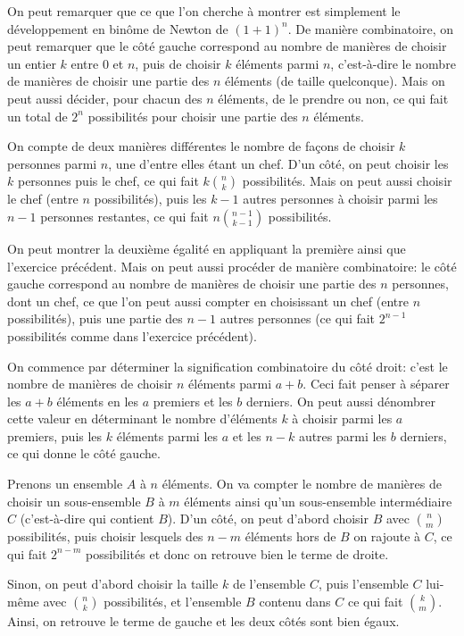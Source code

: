 \begin{sol}
On peut remarquer que ce que l'on cherche à montrer est simplement le développement en binôme de Newton de $(1+1)^n$. De manière combinatoire, on peut remarquer que le côté gauche correspond au nombre de manières de choisir un entier $k$ entre $0$ et $n$, puis de choisir $k$ éléments parmi $n$, c'est-à-dire le nombre de manières de choisir une partie des $n$ éléments (de taille quelconque). Mais on peut aussi décider, pour chacun des $n$ éléments, de le prendre ou non, ce qui fait un total de $2^n$ possibilités pour choisir une partie des $n$ éléments.
\end{sol}

\begin{sol}
On compte de deux manières différentes le nombre de façons de choisir $k$ personnes parmi $n$, une d'entre elles étant un chef. D'un côté, on peut choisir les $k$ personnes puis le chef, ce qui fait $k\binom nk$ possibilités. Mais on peut aussi choisir le chef (entre $n$ possibilités), puis les $k-1$ autres personnes à choisir parmi les $n-1$ personnes restantes, ce qui fait $n\binom{n-1}{k-1}$ possibilités.

On peut montrer la deuxième égalité en appliquant la première ainsi que l'exercice précédent. Mais on peut aussi procéder de manière combinatoire: le côté gauche correspond au nombre de manières de choisir une partie des $n$ personnes, dont un chef, ce que l'on peut aussi compter en choisissant un chef (entre $n$ possibilités), puis une partie des $n-1$ autres personnes (ce qui fait $2^{n-1}$ possibilités comme dans l'exercice précédent).
\end{sol}

\begin{sol}
On commence par déterminer la signification combinatoire du côté droit: c'est le nombre de manières de choisir $n$ éléments parmi $a+b$. Ceci fait penser à séparer les $a+b$ éléments en les $a$ premiers et les $b$ derniers. On peut aussi dénombrer cette valeur en déterminant le nombre d'éléments $k$ à choisir parmi les $a$ premiers, puis les $k$ éléments parmi les $a$ et les $n-k$ autres parmi les $b$ derniers, ce qui donne le côté gauche.
\end{sol}

\begin{sol}
Prenons un ensemble $A$ à $n$ éléments. On va compter le nombre de manières de choisir un sous-ensemble $B$ à $m$ éléments ainsi qu'un sous-ensemble intermédiaire $C$ (c'est-à-dire qui contient $B$). D'un côté, on peut d'abord choisir $B$ avec $\binom nm$ possibilités, puis choisir lesquels des $n-m$ éléments hors de $B$ on rajoute à $C$, ce qui fait $2^{n-m}$ possibilités et donc on retrouve bien le terme de droite.

Sinon, on peut d'abord choisir la taille $k$ de l'ensemble $C$, puis l'ensemble $C$ lui-même avec $\binom nk$ possibilités, et l'ensemble $B$ contenu dans $C$ ce qui fait $\binom km$. Ainsi, on retrouve le terme de gauche et les deux côtés sont bien égaux.
\end{sol}


